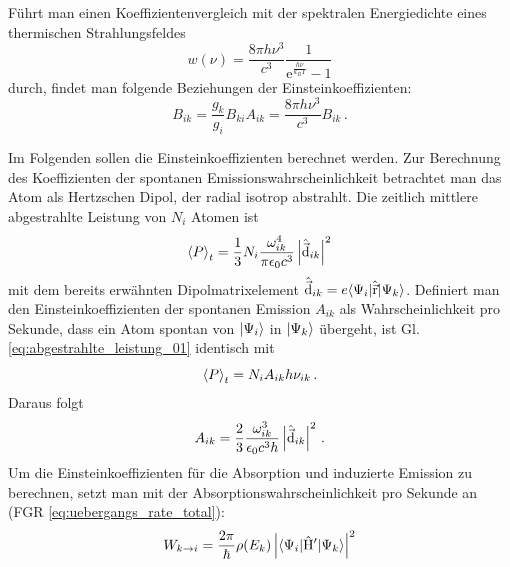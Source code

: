 Führt man einen Koeffizientenvergleich mit der spektralen
Energiedichte eines thermischen Strahlungsfeldes \cite{demtroeder:ex3}
\begin{equation}\label{eq:spektrale_energiedichte_2}
	w(\nu)=\frac{8\pi h\nu^3}{c^3}\frac{1}{\mathrm{e}^\frac{h\nu}{k_BT}-1}
\end{equation}
durch, findet man folgende Beziehungen der Einsteinkoeffizienten:
\begin{subequations}\label{eq:einsteinkoeff_relationen}
	\begin{equation}\label{eq:einsteinkoeff_relationen_1}
		B_{ik}=\frac{g_k}{g_i}B_{ki}
	\end{equation}
	\begin{equation}\label{eq:einsteinkoeff_relationen_2}
		A_{ik}=\frac{8\pi h\nu^3}{c^3}B_{ik}\,.
	\end{equation}
\end{subequations}
\par
Im Folgenden sollen die Einsteinkoeffizienten berechnet werden.
Zur Berechnung des Koeffizienten der spontanen Emissionswahrscheinlichkeit
betrachtet man das Atom als Hertzschen Dipol, der radial isotrop abstrahlt. Die
zeitlich mittlere abgestrahlte Leistung von $N_i$ Atomen
\cite{demtroeder:ex3} ist
\begin{equation}\label{eq:abgestrahlte_leistung_01}
	\left\langle P\right\rangle_t = \frac{1}{3}N_i\frac{\omega_{ik}^4}{\pi\epsilon_0
	c^3}\left|\hat{\vec{\mathrm{d}}}_{ik}\right|^2
\end{equation}
mit dem bereits erwähnten Dipolmatrixelement
$\hat{\vec{\mathrm{d}}}_{ik}=e\langle{\Psi_i}|\hat{\vec{\mathrm{r}}}|{\Psi_k}\rangle$. Definiert man den
Einsteinkoeffizienten der spontanen Emission $A_{ik}$ als Wahrscheinlichkeit pro
Sekunde, dass ein Atom spontan von $|{\Psi_i}\rangle$ in $|{\Psi_k}\rangle$ übergeht,
ist Gl. \eqref{eq:abgestrahlte_leistung_01} identisch mit
\begin{equation}\label{eq:abgestrahlte_leistung_02}
	\left\langle P\right\rangle_t=N_iA_{ik}h\nu_{ik}\,.
\end{equation}
Daraus folgt
\begin{equation}\label{eq:einstein_koeff_A}
	A_{ik}=\frac{2}{3}\frac{\omega_{ik}^3}{\epsilon_0c^3h}\left|\hat{\vec{\mathrm{d}}}_{ik}\right|^2\,.
\end{equation}
Um die Einsteinkoeffizienten für die Absorption und induzierte Emission
zu berechnen, setzt man mit der Absorptionswahrscheinlichkeit pro Sekunde an
(FGR \eqref{eq:uebergangs_rate_total}):
\begin{equation}\label{eq:w_ki_01}
	W_{k\to i}
	= \frac{2\pi}{\hbar}\rho(E_k)\left|\langle{\Psi_i}|\hat{\mathrm{H}}'|{\Psi_k}\rangle\right|^2
\end{equation}
